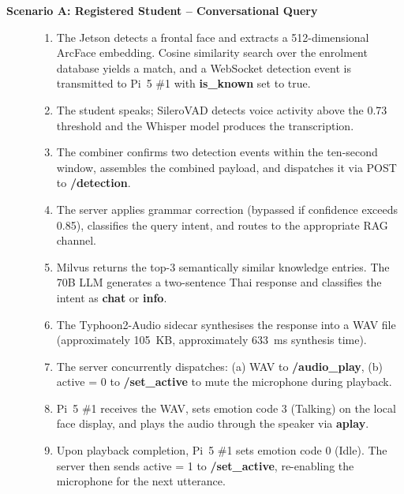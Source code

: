 \begin{description}
    \item[\textbf{Scenario A: Registered Student -- Conversational Query}]
    \noindent
    \begin{enumerate}
        \item The Jetson detects a frontal face and extracts a 512-dimensional ArcFace embedding. Cosine similarity search over the enrolment database yields a match, and a WebSocket detection event is transmitted to Pi~5 \#1 with \textbf{is\_known} set to true.

        \item The student speaks; SileroVAD detects voice activity above the 0.73 threshold and the Whisper model produces the transcription.

        \item The combiner confirms two detection events within the ten-second window, assembles the combined payload, and dispatches it via POST to \textbf{/detection}.

        \item The server applies grammar correction (bypassed if confidence exceeds 0.85), classifies the query intent, and routes to the appropriate RAG channel.

        \item Milvus returns the top-3 semantically similar knowledge entries. The 70B LLM generates a two-sentence Thai response and classifies the intent as \textbf{chat} or \textbf{info}.

        \item The Typhoon2-Audio sidecar synthesises the response into a WAV file (approximately 105~KB, approximately 633~ms synthesis time).

        \item The server concurrently dispatches: (a) WAV to \textbf{/audio\_play}, (b) active = 0 to \textbf{/set\_active} to mute the microphone during playback.

        \item Pi~5 \#1 receives the WAV, sets emotion code 3 (Talking) on the local face display, and plays the audio through the speaker via \textbf{aplay}.

        \item Upon playback completion, Pi~5 \#1 sets emotion code 0 (Idle). The server then sends active = 1 to \textbf{/set\_active}, re-enabling the microphone for the next utterance.
    \end{enumerate}


\end{description}
